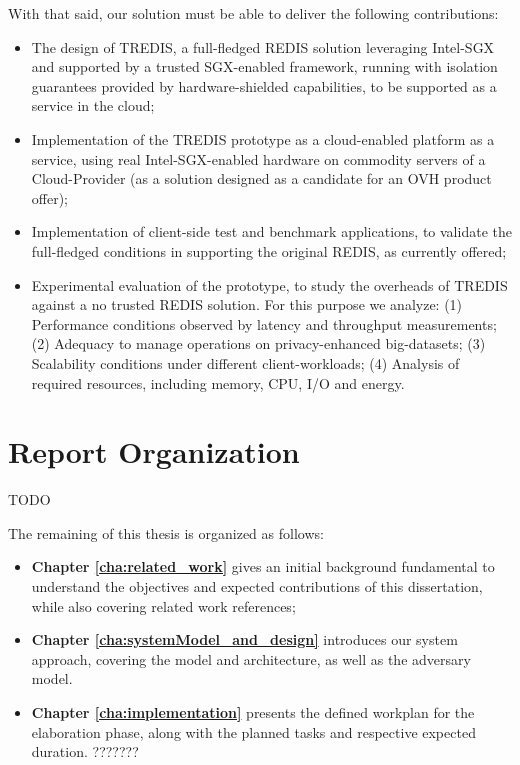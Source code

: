 With that said, our solution must be able to deliver the following contributions:
\begin{itemize}
	\item The design of TREDIS, a full-fledged REDIS solution leveraging Intel-SGX and supported by a trusted SGX-enabled framework, running with isolation guarantees provided by hardware-shielded capabilities, to be supported as a service in the cloud;
	\item Implementation of the TREDIS prototype as a cloud-enabled platform as a service, using real Intel-SGX-enabled hardware on commodity servers of a Cloud-Provider (as a solution designed as a candidate for an OVH product offer);
	\item Implementation of client-side test and benchmark applications, to validate the full-fledged conditions in supporting the original REDIS, as currently offered;
	\item Experimental evaluation of the prototype, to study the overheads of TREDIS against a no trusted REDIS solution. For this purpose we analyze: (1) Performance conditions observed by latency and throughput measurements; (2) Adequacy to manage operations on privacy-enhanced big-datasets; (3) Scalability conditions under different client-workloads; (4) Analysis of required resources, including memory, CPU, I/O and energy.
	
\end{itemize}




\section{Report Organization}

TODO

The remaining of this thesis is organized as follows:
\begin{itemize}
	\item \textbf{Chapter \ref{cha:related_work}} gives an initial background fundamental to understand the objectives and expected contributions of this dissertation, while also covering related work references; 
	\item \textbf{Chapter \ref{cha:systemModel_and_design}} introduces our system approach, covering the model and architecture, as well as the adversary model.
	
	\item \textbf{Chapter \ref{cha:implementation}} presents the defined workplan for the elaboration phase, along with the planned tasks and respective expected duration. ???????
\end{itemize}
